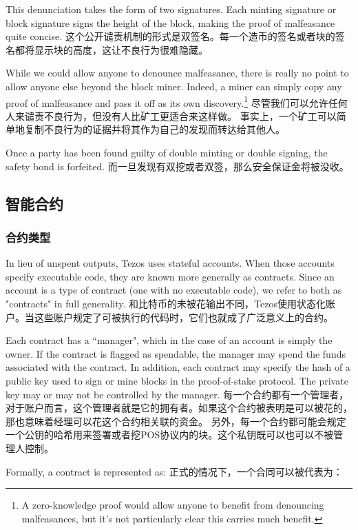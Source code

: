 \documentclass[letterpaper]{article}
\begin{document}
This denunciation takes the form of two signatures. Each minting signature
or block signature signs the height of the block, making the proof of malfeasance quite concise.
这个公开谴责机制的形式是双签名。每一个造币的签名或者块的签名都将显示块的高度，这让不良行为很难隐藏。

While we could allow anyone to denounce malfeasance, there is really no point to
allow anyone else beyond the block miner. Indeed, a miner can
simply copy any proof of malfeasance and pass it off as its own
discovery.\footnote{A zero-knowledge proof would allow anyone to benefit from
denouncing malfeasances, but it's not particularly clear this carries much
benefit.}
尽管我们可以允许任何人来谴责不良行为，但没有人比矿工更适合来这样做。
事实上，一个矿工可以简单地复制不良行为的证据并将其作为自己的发现而转达给其他人。

Once a party has been found guilty of double minting or double signing,
the safety bond is forfeited.
而一旦发现有双挖或者双签，那么安全保证金将被没收。

\subsection{智能合约}


\subsubsection{合约类型}
In lieu of unspent outputs, Tezos uses stateful accounts. When those
accounts specify executable code, they are known more generally as
contracts. Since an account is a type of contract (one with no
executable code), we refer to both as "contracts" in full generality.
和比特币的未被花输出不同，Tezos使用状态化账户。当这些账户规定了可被执行的代码时，它们也就成了广泛意义上的合约。

Each contract has a ``manager", which in the case of an account is 
simply the owner. If the contract is flagged as spendable, the manager
may spend the funds associated with the contract. In addition, each
contract may specify the hash of a public key used to sign or 
mine blocks in the proof-of-stake protocol. The private key may or
may not be controlled by the manager. 
每一个合约都有一个管理者，对于账户而言，这个管理者就是它的拥有者。如果这个合约被表明是可以被花的，那也意味着经理可以花这个合约相关联的资金。
另外，每一个合约都可能会规定一个公钥的哈希用来签署或者挖POS协议内的块。这个私钥既可以也可以不被管理人控制。

Formally, a contract is represented as:
正式的情况下，一个合同可以被代表为：
\end{document}
